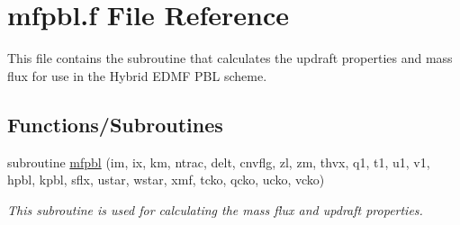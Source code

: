 \hypertarget{mfpbl_8f}{}\section{mfpbl.\+f File Reference}
\label{mfpbl_8f}


This file contains the subroutine that calculates the updraft properties and mass flux for use in the Hybrid E\+D\+MF P\+BL scheme.  


\subsection*{Functions/\+Subroutines}
\textbf{ }\par
\begin{DoxyCompactItemize}
\item 
subroutine \hyperlink{group___h_e_d_m_f_ga5787e718b62c0502c0734303a16cd8ed}{mfpbl} (im, ix, km, ntrac, delt, cnvflg, zl, zm, thvx, q1, t1, u1, v1, hpbl, kpbl, sflx, ustar, wstar, xmf, tcko, qcko, ucko, vcko)
\begin{DoxyCompactList}\small\item\em This subroutine is used for calculating the mass flux and updraft properties. \end{DoxyCompactList}\end{DoxyCompactItemize}

